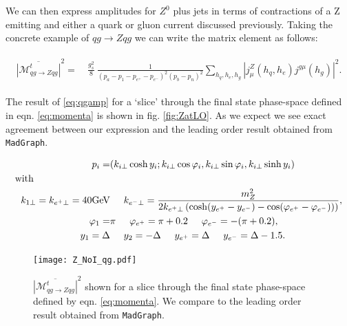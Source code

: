 		We can then express amplitudes for $Z^0$ plus jets in terms of contractions of
		a Z emitting and either a quark or gluon current discussed previously.  Taking
		the concrete example of $qg\to Zqg$ we can write the matrix element as follows:

		\begin{align}
		\begin{split}
			\overline{|\mathcal{M}_{qg\to Zqg}^{t}|}^2 =& \ \frac{g_s^2}{8}\
			\frac{1}{(p_a-p_1-p_{e^+}-p_{e^-})^2 (p_b-p_n)^2}  \sum_{h_q,h_e,h_g}|
			j^{Z}_\mu(h_q,h_e) j^{g\mu}(h_g)|^2.
		  	\label{eq:qgamp}
		\end{split}
		\end{align}

		The result of \eqref{eq:qgamp} for a `slice' through the final state phase-space
		defined in eqn. \eqref{eq:momenta} is shown in fig. \eqref{fig:ZatLO}.  As we expect
		we see exact agreement between our expression and the leading order result obtained
		from \texttt{MadGraph}.

		\begin{align}
		\begin{split}
			p_i = &(k_{i\perp} \cosh y_i; k_{i\perp} \cos \varphi_i, k_{i\perp} \sin \varphi_i, k_{i\perp}
			\sinh y_i) \\
			\mbox{with} \hspace{2.8cm} & \\
			k_{1\perp} = k_{e^+\perp} = 40\mbox{GeV}& \hspace{0.5cm} k_{e^-\perp} =
			\frac{m_Z^2}{2k_{e^+\perp}\left(\cosh(y_{e^+} - y_{e^-}) -
			    \cos(\varphi_{e^+} - \varphi_{e^-}))\right)}, \\
			\varphi_{1} =& \pi \hspace{0.5cm} \varphi_{e^+} = \pi + 0.2 \hspace{0.5cm}
			\varphi_{e^-} = -(\pi + 0.2), \\
			y_1=\Delta& \hspace{0.5cm} y_2=-\Delta \hspace{0.5cm} y_{e^+} = \Delta
			\hspace{0.5cm} y_{e^-} = \Delta - 1.5.
			\label{eq:momenta}
		\end{split}
		\end{align}

		\begin{figure}[hbt]
			\centering
			\texttt{[image: Z\_NoI\_qg.pdf]}
			\caption{$\overline{|\mathcal{M}_{qg\to Zqg}^{t}|}^2$ shown for a slice through the
			final state phase-space defined by eqn. \eqref{eq:momenta}.  We compare to the
			leading order result obtained from \texttt{MadGraph}.}
			\label{fig:ZatLO}
		\end{figure}

